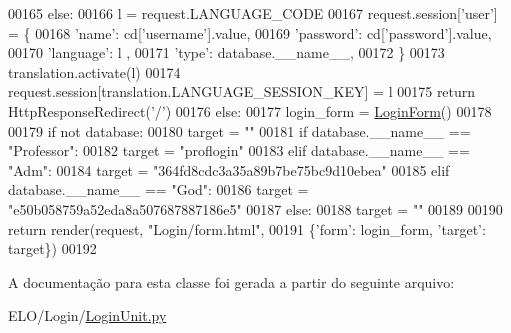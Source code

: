 \begin{DoxyCode}
00165                 \textcolor{keywordflow}{else}:
00166                     l = request.LANGUAGE\_CODE
00167                 request.session[\textcolor{stringliteral}{'user'}] = \{
00168                                 \textcolor{stringliteral}{'name'}: cd[\textcolor{stringliteral}{'username'}].value,
00169                                 \textcolor{stringliteral}{'password'}: cd[\textcolor{stringliteral}{'password'}].value,
00170                                 \textcolor{stringliteral}{'language'}: l ,
00171                                 \textcolor{stringliteral}{'type'}: database.\_\_name\_\_,
00172                             \}
00173                 translation.activate(l)
00174                 request.session[translation.LANGUAGE\_SESSION\_KEY] = l
00175                 \textcolor{keywordflow}{return} HttpResponseRedirect(\textcolor{stringliteral}{'/'})
00176         \textcolor{keywordflow}{else}:
00177             login\_form = \hyperlink{classLogin_1_1forms_1_1LoginForm}{LoginForm}()
00178 
00179             \textcolor{keywordflow}{if} \textcolor{keywordflow}{not} database:
00180                 target = \textcolor{stringliteral}{""}
00181             \textcolor{keywordflow}{if} database.\_\_name\_\_ == \textcolor{stringliteral}{"Professor"}:
00182                 target = \textcolor{stringliteral}{"proflogin"}
00183             \textcolor{keywordflow}{elif} database.\_\_name\_\_ == \textcolor{stringliteral}{"Adm"}:
00184                 target = \textcolor{stringliteral}{"364fd8cdc3a35a89b7be75bc9d10ebea"}
00185             \textcolor{keywordflow}{elif} database.\_\_name\_\_ == \textcolor{stringliteral}{"God"}:
00186                 target = \textcolor{stringliteral}{"e50b058759a52eda8a507687887186e5"}
00187             \textcolor{keywordflow}{else}:
00188                 target = \textcolor{stringliteral}{""}
00189 
00190             \textcolor{keywordflow}{return} render(request, \textcolor{stringliteral}{"Login/form.html"}, 
00191                 \{\textcolor{stringliteral}{'form'}: login\_form, \textcolor{stringliteral}{'target'}: target\})
00192 

\end{DoxyCode}


A documentação para esta classe foi gerada a partir do seguinte arquivo\-:\begin{DoxyCompactItemize}
\item 
E\-L\-O/\-Login/\hyperlink{LoginUnit_8py}{Login\-Unit.\-py}\end{DoxyCompactItemize}
